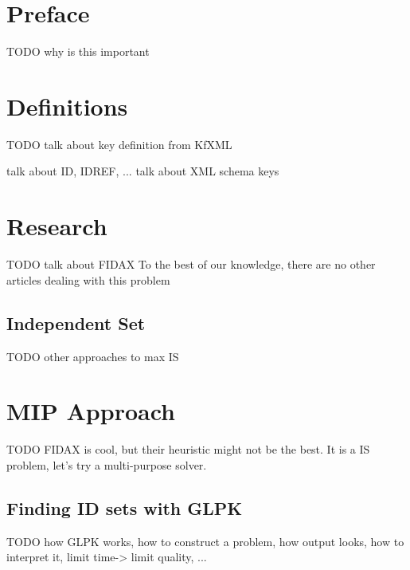\documentclass[a4paper,12pt,oneside]{report}
\let\openright=\clearpage
\begin{document}
\newpage


\openright
\pagestyle{plain}
\setcounter{page}{1}
\tableofcontents

\newpage

\chapter*{Preface}

TODO why is this important

\chapter{Definitions}

TODO talk about key definition from KfXML

talk about ID, IDREF, ... talk about XML schema keys

\chapter{Research}

TODO talk about FIDAX
To the best of our knowledge, there are no other articles dealing with this problem 

\section{Independent Set}

TODO other approaches to max IS

\chapter{MIP Approach}

TODO FIDAX is cool, but their heuristic might not be the best. It is a IS problem, let's try a multi-purpose solver.

\section{Finding ID sets with GLPK}

TODO how GLPK works, how to construct a problem, how output looks, how to interpret it, limit time-> limit quality, ...
 
\end{document}
